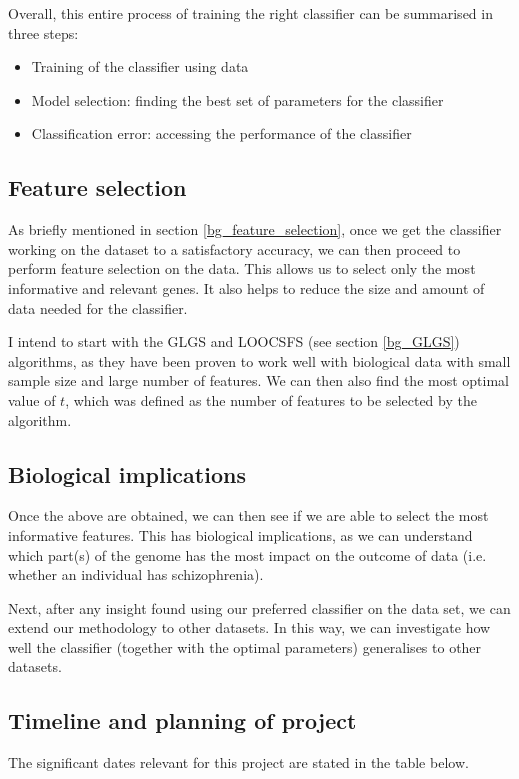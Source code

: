 \documentclass[12pt, twoside, a4paper]{article}
\begin{document}
Overall, this entire process of training the right classifier can be summarised in three steps:
\begin{itemize}
\item Training of the classifier using data
\item Model selection: finding the best set of parameters for the classifier
\item Classification error: accessing the performance of the classifier
\end{itemize}

\subsection{Feature selection}
As briefly mentioned in section \ref{bg_feature_selection}, once we get the classifier working on the dataset to a satisfactory accuracy, we can then proceed to perform feature selection on the data. This allows us to select only the most informative and relevant genes. It also helps to reduce the size and amount of data needed for the classifier.

I intend to start with the GLGS and LOOCSFS (see section \ref{bg_GLGS}) algorithms, as they have been proven to work well with biological data with small sample size and large number of features. We can then also find the most optimal value of $t$, which was defined as the number of features to be selected by the algorithm.

\subsection{Biological implications}
Once the above are obtained, we can then see if we are able to select the most informative features. This has biological implications, as we can understand which part(s) of the genome has the most impact on the outcome of data (i.e. whether an individual has schizophrenia).

Next, after any insight found using our preferred classifier on the data set, we can extend our methodology to other datasets. In this way, we can investigate how well the classifier (together with the optimal parameters) generalises to other datasets.

\subsection{Timeline and planning of project}

The significant dates relevant for this project are stated in the table below.
\end{document}
